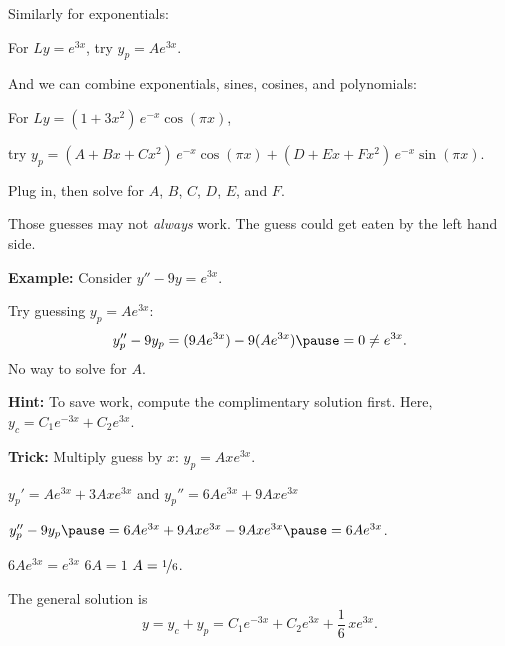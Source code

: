 \documentclass[10pt,aspectratio=169]{beamer}
\begin{document}
\begin{frame}
Similarly for exponentials:

\medskip

For
\quad $Ly = e^{3x}$, \quad try
$y_p = A e^{3x}$.

\medskip
\pause

And we can combine exponentials, sines, cosines, and polynomials:

\medskip
\pause

For
\quad
$Ly = (1+3x^2)\,e^{-x}\cos (\pi x)$,

\medskip
try
$y_p = (A + Bx + Cx^2)\,e^{-x} \cos (\pi x) + 
(D + Ex + Fx^2)\,e^{-x} \sin (\pi x)$.

\medskip
\pause

Plug in, then solve for $A$, $B$, $C$, $D$, $E$, and $F$.
\end{frame}

\begin{frame}
Those guesses may not \emph{always} work. \pause
The guess could get eaten by the left hand side.

\medskip
\pause

\textbf{Example:}
Consider
\quad $y'' - 9y = e^{3x}$.

\medskip
\pause

Try guessing \quad $y_p = Ae^{3x}$:
\pause
\[
y_p''-9y_p = (9Ae^{3x}) - 9(Ae^{3x}) \pause = 0 \not= e^{3x} .
\]
\pause
No way to solve for $A$.

\medskip
\pause

\textbf{Hint:} To save work, compute the complimentary solution first.
Here, $y_c = C_1 e^{-3x} + C_2 e^{3x}$.

\medskip
\pause

\textbf{Trick:} Multiply guess by $x$: \quad $y_p = Axe^{3x}$.

\medskip
\pause

\quad $y_p' = Ae^{3x} + 3Axe^{3x}$ \quad and \quad $y_p'' = 6Ae^{3x} + 9Axe^{3x}$

\medskip
\pause

\quad $y_p'' -9y_p \pause = 6Ae^{3x} + 9Axe^{3x} - 9Axe^{3x} \pause = 6Ae^{3x}$.

\medskip
\pause

\thus \quad $6Ae^{3x} = e^{3x}$ \wthus $6A = 1$ \wthus $A=\nicefrac{1}{6}$.

\medskip
\pause

The general solution is
\[
y = y_c + y_p = 
C_1 e^{-3x} + C_2 e^{3x} + \frac{1}{6}\,xe^{3x} .
\]
\end{frame}
\end{document}
